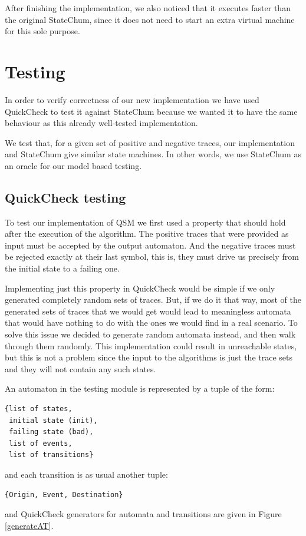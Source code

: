 \documentclass[]{sigplanconf}
\begin{document}
After finishing the implementation, we also noticed that it executes
faster than the original StateChum, since it does not need to start an extra virtual machine for this sole purpose.

\section{Testing}
\label{testing}

In order to verify correctness of our new implementation
we have used QuickCheck to test it against StateChum \cite{statechum}
because we wanted it to have the same behaviour as this already well-tested
implementation.

We test that, for a given set of positive and negative traces,
our implementation and StateChum give similar state machines.
In other words, we use StateChum as an oracle for our model based testing.

\subsection{QuickCheck testing}

To test our implementation of QSM we first used a property
that should hold after the execution of the algorithm. The positive
traces that were provided as input must be accepted by the output
automaton. And the negative traces must be rejected exactly at their
last symbol, this is, they must drive us precisely from the initial
state to a failing one.

Implementing just this property in QuickCheck would be simple if we only
generated completely random sets of traces. But, if we do it that way,
most of the generated sets of traces that we would get would lead to
meaningless automata that would have nothing to do with the ones we
would find in a real scenario. To solve this issue we decided to
generate random automata instead, and then walk through them randomly.
This implementation could result in unreachable states, but this is not
a problem since the input to the algorithms is just the trace sets and they
will not contain any such states.

An automaton in the testing module is represented by a tuple of the form:
\begin{verbatim}
{list of states, 
 initial state (init), 
 failing state (bad), 
 list of events, 
 list of transitions}
\end{verbatim}
and each
transition is as usual another tuple:
\begin{verbatim}
{Origin, Event, Destination}
\end{verbatim}
and QuickCheck generators for automata and transitions are given in Figure \ref{generateAT}.
\end{document}
